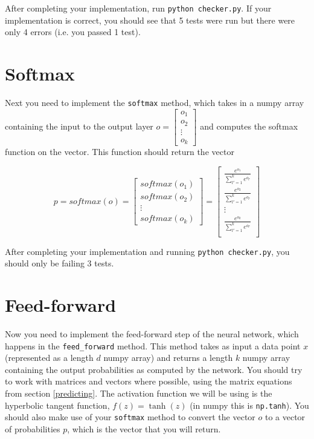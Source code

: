 \documentclass{article}
\begin{document}
After completing your implementation, run \texttt{python checker.py}. If your implementation is correct, you should see that 5 tests were run but there were only 4 errors (i.e. you passed 1 test).

\section{Softmax}

Next you need to implement the \texttt{softmax} method, which takes in a numpy array containing the input to the output layer
$o = 
\begin{bmatrix}
    o_1 \\
    o_2 \\
    \vdots \\
    o_k
\end{bmatrix}
$
and computes the softmax function on the vector. This function should return the vector

$$p = softmax(o) =
\begin{bmatrix}
    softmax(o_1) \\
    softmax(o_2) \\
    \vdots \\
    softmax(o_k)
\end{bmatrix}
=
\begin{bmatrix}
    \frac{e^{o_1}}{\sum_{l'=1}^k e^{o_{l'}}} \\
    \frac{e^{o_2}}{\sum_{l'=1}^k e^{o_{l'}}} \\
    \vdots \\
\frac{e^{o_k}}{\sum_{l'=1}^k e^{o_{l'}}} \\
\end{bmatrix}
$$

After completing your implementation and running \texttt{python checker.py}, you should only be failing 3 tests.

\section{Feed-forward}

Now you need to implement the feed-forward step of the neural network, which happens in the \texttt{feed\_forward} method. This method takes as input a data point $x$ (represented as a length $d$ numpy array) and returns a length $k$ numpy array containing the output probabilities as computed by the network. You should try to work with matrices and vectors where possible, using the matrix equations from section \ref{predicting}. The activation function we will be using is the hyperbolic tangent function, $f(z) = \tanh(z)$ (in numpy this is \texttt{np.tanh}). You should also make use of your \texttt{softmax} method to convert the vector $o$ to a vector of probabilities $p$, which is the vector that you will return.
\end{document}

